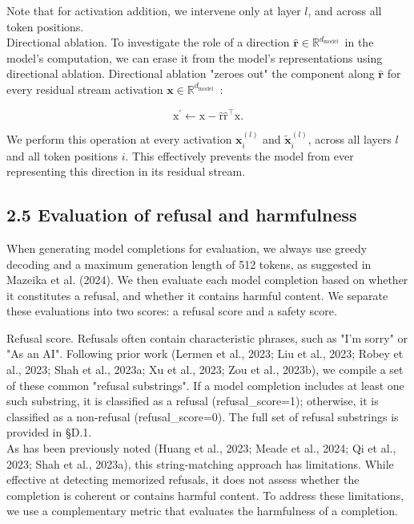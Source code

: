 \documentclass[10pt]{article}
\begin{document}
Note that for activation addition, we intervene only at layer $l$, and across all token positions.\\
Directional ablation. To investigate the role of a direction $\hat{\mathbf{r}} \in \mathbb{R}^{d_{\text {model }}}$ in the model's computation, we can erase it from the model's representations using directional ablation. Directional ablation "zeroes out" the component along $\hat{\mathbf{r}}$ for every residual stream activation $\mathbf{x} \in \mathbb{R}^{d_{\text {model }}}$ :


\begin{equation*}
\mathrm{x}^{\prime} \leftarrow \mathrm{x}-\hat{\mathrm{r}} \hat{\mathrm{r}}^{\top} \mathrm{x} . \tag{4}
\end{equation*}


We perform this operation at every activation $\mathbf{x}_{i}^{(l)}$ and $\tilde{\mathbf{x}}_{i}^{(l)}$, across all layers $l$ and all token positions $i$. This effectively prevents the model from ever representing this direction in its residual stream.

\subsection*{2.5 Evaluation of refusal and harmfulness}
When generating model completions for evaluation, we always use greedy decoding and a maximum generation length of 512 tokens, as suggested in Mazeika et al. (2024). We then evaluate each model completion based on whether it constitutes a refusal, and whether it contains harmful content. We separate these evaluations into two scores: a refusal score and a safety score.

Refusal score. Refusals often contain characteristic phrases, such as "I'm sorry" or "As an AI". Following prior work (Lermen et al., 2023; Liu et al., 2023; Robey et al., 2023; Shah et al., 2023a; Xu et al., 2023; Zou et al., 2023b), we compile a set of these common "refusal substrings". If a model completion includes at least one such substring, it is classified as a refusal (refusal\_score=1); otherwise, it is classified as a non-refusal (refusal\_score=0). The full set of refusal substrings is provided in §D.1.\\
As has been previously noted (Huang et al., 2023; Meade et al., 2024; Qi et al., 2023; Shah et al., 2023a), this string-matching approach has limitations. While effective at detecting memorized refusals, it does not assess whether the completion is coherent or contains harmful content. To address these limitations, we use a complementary metric that evaluates the harmfulness of a completion.
\end{document}
